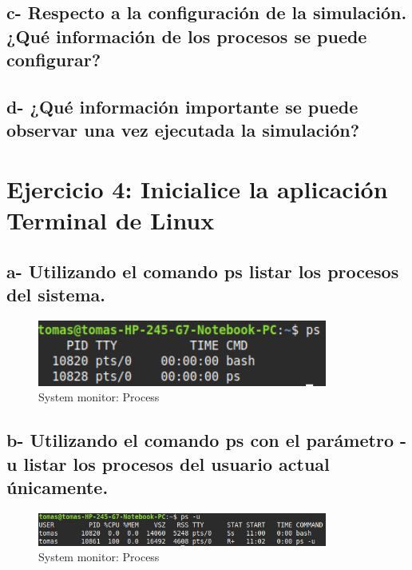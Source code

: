 \documentclass{article}
\begin{document}
\subsection*{c- Respecto a la configuración de la simulación. ¿Qué información de los procesos se puede
configurar?}
\subsection*{d- ¿Qué información importante se puede observar una vez ejecutada la simulación?}

\section*{Ejercicio 4: Inicialice la aplicación Terminal de Linux}


\subsection*{a- Utilizando el comando ps listar los procesos del sistema.}
\begin{figure}[h]
  \centering
  \includegraphics[width=0.85\textwidth]{resources/4a.png}
  \caption{System monitor: Process}
\end{figure}
\subsection*{b- Utilizando el comando ps con el parámetro -u listar los procesos del usuario actual únicamente.}
\begin{figure}[h]
  \centering
  \includegraphics[width=0.85\textwidth]{resources/4b.png}
  \caption{System monitor: Process}
\end{figure}
\end{document}
